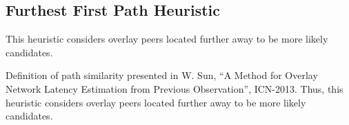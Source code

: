 \documentclass[conference]{IEEEtran}
\begin{document}
\subsection{Furthest First Path Heuristic}
This heuristic considers overlay peers located further away to be more likely candidates.

\begin{algorithm}
\DontPrintSemicolon
{}
\SetAlgoLined
\SetAlgoLongEnd
\scriptsize
{}
\caption{Definition of path similarity presented in W. Sun, ``A Method for Overlay Network Latency Estimation from Previous Observation'', ICN-2013. Thus, this heuristic considers overlay peers located further away to be more likely candidates.}
\small
\end{algorithm}
\end{document}
